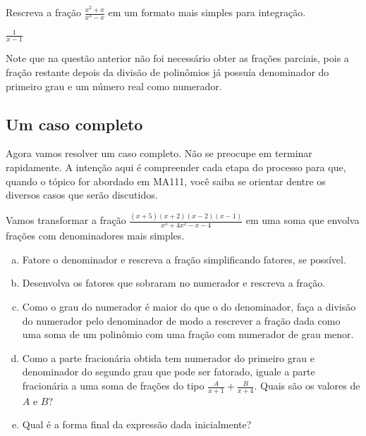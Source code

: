 \documentclass[main_estudante.tex]{subfiles}
\begin{document}

\begin{questao}
Rescreva a fração $\frac{x^2+x}{x^3-x}$ em um formato mais simples para integração.
\end{questao}

\begin{gabarito}
	\begin{gabaritoQuestao}
		$\frac{1}{x-1}$
	\end{gabaritoQuestao}
\end{gabarito}

Note que na questão anterior não foi necessário obter as frações parciais, pois a fração restante depois da divisão de polinômios já possuía denominador do primeiro grau e um número real como numerador.

\subsection*{Um caso completo}

Agora vamos resolver um caso completo. Não se preocupe em terminar rapidamente. A intenção aqui é compreender cada etapa do processo para que, quando o tópico for abordado em MA111, você saiba se orientar dentre os diversos casos que serão discutidos.

\begin{questao}
Vamos transformar a fração $\frac{(x+5)(x+2)(x-2)(x-1)}{x^3+4x^2-x-4}$ em uma soma que envolva frações com denominadores mais simples.
\begin{enumerate}[a)]
\item Fatore o denominador e rescreva a fração simplificando fatores, se possível.
\item Desenvolva os fatores que sobraram no numerador e rescreva a fração.
\item Como o grau do numerador é maior do que o do denominador, faça a divisão do numerador pelo denominador de modo a rescrever a fração dada como uma soma de um polinômio com uma fração com numerador de grau menor.
\item Como a parte fracionária obtida tem numerador do primeiro grau e denominador do segundo grau que pode ser fatorado, iguale a parte fracionária a uma soma de frações do tipo $\frac{A}{x+1}+\frac{B}{x+4}$. Quais são os valores de $A$ e $B$?
\item Qual é a forma final da expressão dada inicialmente?
\end{enumerate}
\end{questao}
\end{document}
